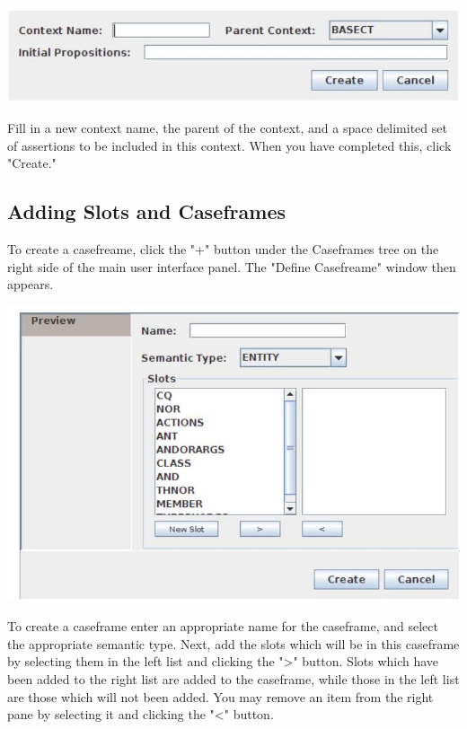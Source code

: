 \documentclass[10pt]{article}
\begin{document}
\begin{center}
\includegraphics[max width=\textwidth]{2023_06_06_402e2c8ca4c84733095bg-4(1)}
\end{center}

Fill in a new context name, the parent of the context, and a space delimited set of assertions to be included in this context. When you have completed this, click "Create."

\subsection{Adding Slots and Caseframes}
To create a casefreame, click the "+" button under the Caseframes tree on the right side of the main user interface panel. The "Define Casefreame" window then appears.

\begin{center}
\includegraphics[max width=\textwidth]{2023_06_06_402e2c8ca4c84733095bg-4}
\end{center}

To create a caseframe enter an appropriate name for the caseframe, and select the appropriate semantic type. Next, add the slots which will be in this caseframe by selecting them in the left list and clicking the ">" button. Slots which have been added to the right list are added to the caseframe, while those in the left list are those which will not been added. You may remove an item from the right pane by selecting it and clicking the "<" button.
\end{document}
